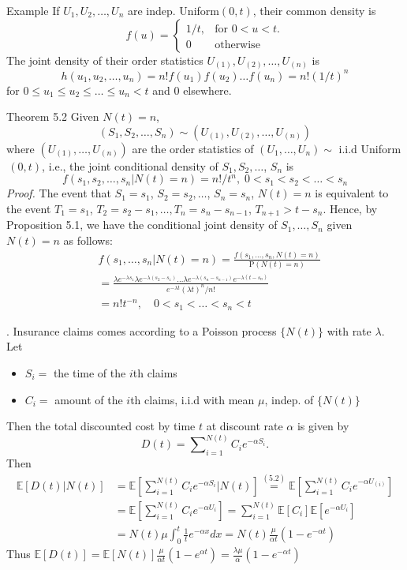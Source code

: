 \documentclass[letterpaper,handout, mathserif]{beamer}
\def\Sum{\sum\nolimits}
\def\p{\mathrm P}
\def\E{\mathbb E}
\begin{document}
\begin{frame}{Example}
If $U_1, U_2, \ldots, U_n$ are indep. Uniform$(0,t)$,
their common density is
$$
f(u)=
\begin{cases}
1/t,& \text{for }0<u<t.\\
0 &\text{otherwise}
\end{cases}
$$
The joint density of their order statistics $U_{(1)}, U_{(2)},\ldots, U_{(n)}$ is
$$
h(u_1,u_2,\ldots,u_n)=n! f(u_1)f(u_2)\ldots f(u_n)=n!(1/t)^n
$$
for $0\le u_1\le u_2\le \ldots\le u_n< t$ and 0 elsewhere.
\end{frame}
\begin{frame}{Theorem 5.2}
Given $N(t)=n$, $$(S_1,S_2,\ldots,S_n)\sim(U_{(1)},U_{(2)},\ldots,U_{(n)})$$
where $(U_{(1)},\ldots,U_{(n)})$ are the order statistics of $(U_1,\ldots,U_n)\sim$ i.i.d Uniform$\,(0,t)$, i.e., the joint conditional density of $S_1,S_2,\ldots$, $S_n$ is
$$
f(s_1,s_2,\ldots,s_n|N(t)=n)=n!/t^n,\; 0<s_1<s_2<\ldots<s_n
$$
{\em Proof.}
The event that $S_1 = s_1$, $S_2 = s_2, \ldots$, $S_n = s_n$, $N(t) = n$ is equivalent to the event $T_1 = s_1$, $T_2 = s_2- s_1,\ldots, T_n = s_n- s_{n-1}$, $T_{n+1} > t-s_n$. Hence, by
Proposition 5.1, we have the conditional joint density of $S_1,\ldots, S_n$ given $N(t) = n$ as follows:
\begin{align*}
&f(s_1,\ldots, s_n| N(t) = n)= \frac{f(s_1,\ldots, s_n,N(t) = n)}{\p(N(t)=n)}\\
&=\frac{\lambda e^{-\lambda s_1}\lambda e^{-\lambda (s_2-s_1)}\ldots\lambda e^{-\lambda (s_n-s_{n-1})}
e^{-\lambda (t-s_n)}}{e^{-\lambda t} (\lambda t)^n/n!}\\
&=n!t^{-n},\quad 0 < s_1 <\ldots< s_n < t
\end{align*}
\end{frame}
\begin{frame}.
Insurance claims comes according to a Poisson process $\{N(t)\}$ with rate $\lambda$. Let
\begin{itemize}
\item $S_i=$ the time of the $i$th claims
\item $C_i=$ amount of the $i$th claims, i.i.d with mean $\mu$, indep. of $\{N(t)\}$
\end{itemize}
Then the  total discounted cost by time $t$ at discount rate $\alpha$ is given by
$$D(t) =\Sum_{i=1}^{N(t)}C_i e^{-\alpha S_i}.$$
Then
\begin{align*}
\E[D(t)|N(t)]&=\E\left[\Sum_{i=1}^{N(t)}C_i e^{-\alpha S_i}\Big|N(t)\right]\overset{(5.2)}{=}\E\left[\Sum_{i=1}^{N(t)}C_i e^{-\alpha U_{(i)}}\right]\\
&=\E\left[\Sum_{i=1}^{N(t)}C_i e^{-\alpha U_i}\right]=\Sum_{i=1}^{N(t)}\E[C_i]\E\left[e^{-\alpha U_i}\right]\\
&=N(t)\mu\int_0^t\frac{1}{t}e^{-\alpha x}dx=N(t)\frac{\mu}{\alpha t}(1-e^{-\alpha t})
\end{align*}
Thus $\E[D(t)]=\E[N(t)]\frac{\mu}{\alpha t}(1-e^{\alpha t})=\frac{\lambda\mu}{\alpha }(1-e^{-\alpha t})$
\end{frame}
\end{document}
